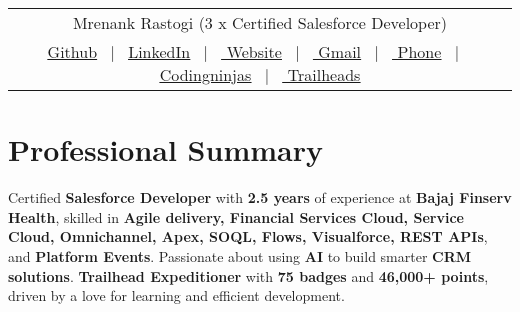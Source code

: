 \documentclass[a4paper,12pt]{article}
\begin{document}
\pagestyle{empty}
\begin{tabularx}{\linewidth}{@{} C @{}}
\Huge{Mrenank Rastogi} \large{(3 x Certified Salesforce Developer)} \\[7.5pt]
\href{https://github.com/me-no-coder}{\underline{Github}} \ $|$ \ 
\href{https://linkedin.com/in/mrenank-rastogi-4454651b5/}{\underline{LinkedIn}} \ $|$ \ 
\href{https://mrenankrastogi.netlify.app/}{\underline{ Website}} \ $|$ \ 
\href{mailto:mrenankrastogi@gmail.com}{\underline{ Gmail}} \ $|$ \ 
\href{tel:(+91) 914092361}{\underline{ Phone}} \ $|$ \
\href{https://codingninjas.com/codestudio/profile/mrenankrastogi/}{\underline{ Codingninjas}} \ $|$ \
\href{https://www.salesforce.com/trailblazer/mrenankrastogi}{\underline{ Trailheads}} \\
\end{tabularx}
\section{Professional Summary}
\vspace{0.15em}
Certified \textbf{Salesforce Developer} with \textbf{2.5 years} of experience at \textbf{Bajaj Finserv Health}, skilled in \textbf{Agile delivery, Financial Services Cloud, Service Cloud, Omnichannel, Apex, SOQL, Flows, Visualforce, REST APIs}, and \textbf{Platform Events}. Passionate about using \textbf{AI} to build smarter \textbf{CRM solutions}. \textbf{Trailhead Expeditioner} with \textbf{75 badges} and \textbf{46,000+ points}, driven by a love for learning and efficient development.
\end{document}
